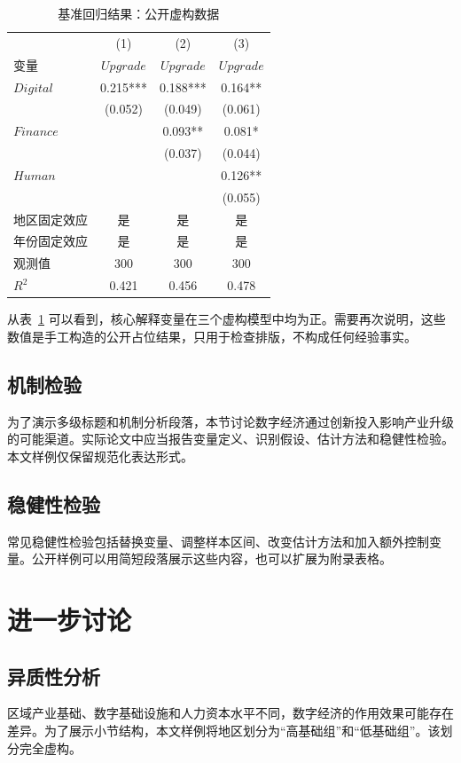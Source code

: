 \documentclass[12pt]{ctexbook}
\begin{document}
\begin{table}[htbp]
\centering
\caption{基准回归结果：公开虚构数据}
\label{tab:regression}
\begin{tabular}{lccc}
\toprule
 & (1) & (2) & (3) \\
变量 & $Upgrade$ & $Upgrade$ & $Upgrade$ \\
\midrule
$Digital$ & 0.215*** & 0.188*** & 0.164** \\
 & (0.052) & (0.049) & (0.061) \\
$Finance$ &  & 0.093** & 0.081* \\
 &  & (0.037) & (0.044) \\
$Human$ &  &  & 0.126** \\
 &  &  & (0.055) \\
地区固定效应 & 是 & 是 & 是 \\
年份固定效应 & 是 & 是 & 是 \\
观测值 & 300 & 300 & 300 \\
$R^2$ & 0.421 & 0.456 & 0.478 \\
\bottomrule
\end{tabular}
\end{table}

从表~\ref{tab:regression} 可以看到，核心解释变量在三个虚构模型中均为正。需要再次说明，这些数值是手工构造的公开占位结果，只用于检查排版，不构成任何经验事实。

\section{机制检验}
为了演示多级标题和机制分析段落，本节讨论数字经济通过创新投入影响产业升级的可能渠道。实际论文中应当报告变量定义、识别假设、估计方法和稳健性检验。本文样例仅保留规范化表达形式。

\section{稳健性检验}
常见稳健性检验包括替换变量、调整样本区间、改变估计方法和加入额外控制变量。公开样例可以用简短段落展示这些内容，也可以扩展为附录表格。

\chapter{进一步讨论}
\section{异质性分析}
区域产业基础、数字基础设施和人力资本水平不同，数字经济的作用效果可能存在差异。为了展示小节结构，本文样例将地区划分为“高基础组”和“低基础组”。该划分完全虚构。
\end{document}
